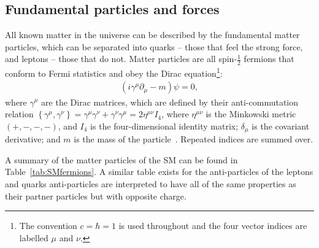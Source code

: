 \subsection{Fundamental particles and forces}
All known matter in the universe can be described by the fundamental matter particles, which can be separated into quarks -- those that feel the strong force, and leptons -- those that do not.
Matter particles are all spin-$\frac{1}{2}$ fermions that conform to Fermi statistics and obey the Dirac equation\footnote{The convention $c=\hbar=1$ is used throughout and the four vector indices are labelled $\mu$ and $\nu$.}:
%
\begin{eqnarray}
\label{eqn:Dirac}
(i \gamma ^{\mu} \partial_{\mu} - m) \psi =0,
\end{eqnarray}
%
where $\gamma^{\mu}$ are the Dirac matrices, which are defined by their anti-commutation relation 
$\left\{ \gamma^{\mu}, \gamma^{\nu} \right\} = \gamma^{\mu} \gamma^{\nu} + \gamma^{\nu} \gamma^{\mu} = 2 \eta^{\mu\nu}I_{4}$,
where
$ \eta^{\mu\nu} $ is the Minkowski metric $(+, -, -, -)$, and $I_{4}$ is the four-dimensional identity matrix;
$\delta_{\mu}$ is the covariant derivative; and $m$ is the mass of the particle~\cite{HalzenMartin}.
Repeated indices are summed over.

A summary of the matter particles of the \ac{SM} can be found in Table~\ref{tab:SMfermions}. 
A similar table exists for the anti-particles of the leptons and quarks anti-particles are interpreted to have all of the same properties as their partner particles but with opposite charge.


